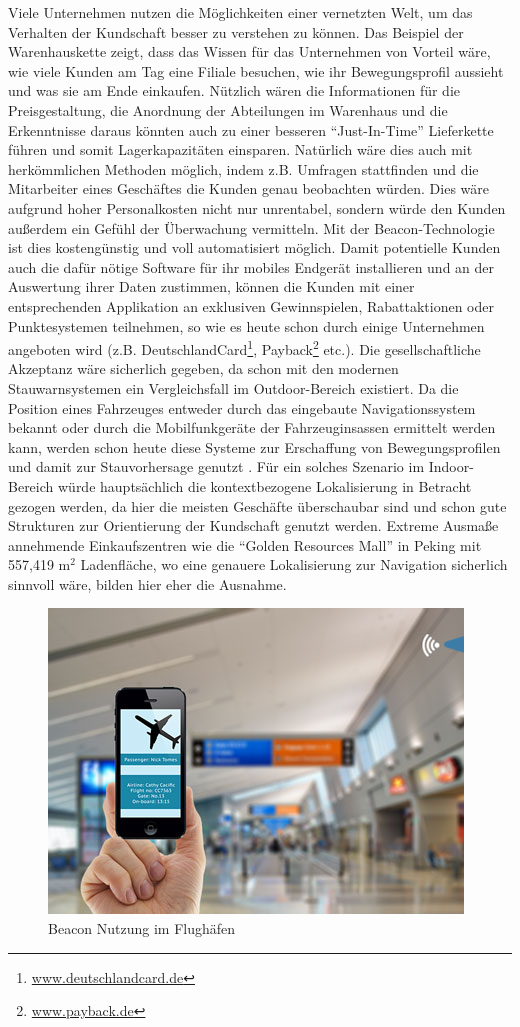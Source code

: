 Viele Unternehmen nutzen die Möglichkeiten einer vernetzten Welt, um das Verhalten der Kundschaft besser zu verstehen zu können. Das Beispiel der Warenhauskette zeigt, dass das Wissen für das Unternehmen von Vorteil wäre, wie viele Kunden am Tag eine Filiale besuchen, wie ihr Bewegungsprofil aussieht und was sie am Ende einkaufen. Nützlich wären die Informationen für die Preisgestaltung, die Anordnung der Abteilungen im Warenhaus und die Erkenntnisse daraus könnten auch zu einer besseren "`Just-In-Time"' Lieferkette führen und somit Lagerkapazitäten einsparen. Natürlich wäre dies auch mit herkömmlichen Methoden möglich, indem z.B. Umfragen stattfinden und die Mitarbeiter eines Geschäftes die Kunden genau beobachten würden. Dies wäre aufgrund hoher Personalkosten nicht nur unrentabel, sondern würde den Kunden außerdem ein Gefühl der Überwachung vermitteln. Mit der Beacon-Technologie ist dies kostengünstig und voll automatisiert möglich. Damit potentielle Kunden auch die dafür nötige Software für ihr mobiles Endgerät installieren und an der Auswertung ihrer Daten zustimmen, können die Kunden mit einer entsprechenden Applikation an exklusiven Gewinnspielen, Rabattaktionen oder Punktesystemen teilnehmen, so wie es heute schon durch einige Unternehmen angeboten wird (z.B. DeutschlandCard\footnote{\url{www.deutschlandcard.de}}, Payback\footnote{\url{www.payback.de}} etc.). Die gesellschaftliche Akzeptanz wäre sicherlich gegeben, da schon mit den modernen Stauwarnsystemen ein Vergleichsfall im Outdoor-Bereich existiert. Da die Position eines Fahrzeuges entweder durch das eingebaute Navigationssystem bekannt oder durch die Mobilfunkgeräte der Fahrzeuginsassen ermittelt werden kann, werden schon heute diese Systeme zur Erschaffung von Bewegungsprofilen und damit zur Stauvorhersage genutzt \cite{Stau}. Für ein solches Szenario im Indoor-Bereich würde hauptsächlich die kontextbezogene Lokalisierung in Betracht gezogen werden, da hier die meisten Geschäfte überschaubar sind und schon gute Strukturen zur Orientierung der Kundschaft genutzt werden. Extreme Ausmaße annehmende Einkaufszentren wie die "`Golden Resources Mall"' in Peking mit 557,419 $\text{m}^2$ Ladenfläche, wo eine genauere Lokalisierung zur Navigation sicherlich sinnvoll wäre, bilden hier eher die Ausnahme. \par\bigskip
\begin{figure} 
\centering
\includegraphics[scale=0.5]{Bilder/iBeaconAirport}
\caption{Beacon Nutzung im Flughäfen \cite{Airpo}}
\label{Airpo}
\end{figure}
